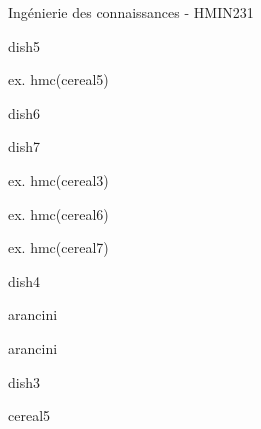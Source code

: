 \documentclass[a4paper,portrait,12pt]{article}
\begin{document}
\begin{flushleft}
\newpage
Ingénierie des connaissances - HMIN231
\end{flushleft}





\begin{flushleft}
dish5
\end{flushleft}


\begin{flushleft}
ex. hmc(cereal5)
\end{flushleft}





\begin{flushleft}
dish6
\end{flushleft}


\begin{flushleft}
dish7
\end{flushleft}


\begin{flushleft}
ex. hmc(cereal3)
\end{flushleft}


\begin{flushleft}
ex. hmc(cereal6)
\end{flushleft}


\begin{flushleft}
ex. hmc(cereal7)
\end{flushleft}





\begin{flushleft}
dish4
\end{flushleft}


\begin{flushleft}
arancini
\end{flushleft}


\begin{flushleft}
arancini
\end{flushleft}





\begin{flushleft}
dish3
\end{flushleft}





\begin{flushleft}
cereal5
\end{flushleft}
\end{document}
